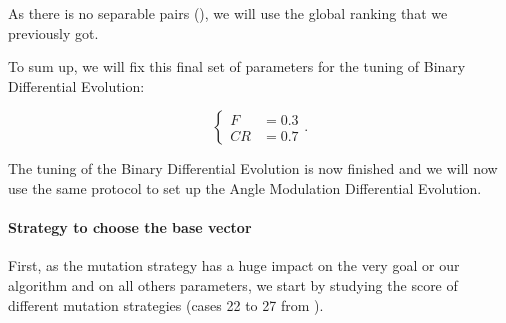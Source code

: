 \documentclass[12pt, openany]{article}
\begin{document}
As there is no separable pairs (), we will use the global ranking that we previously got.

\begin{table}[H]
    \centering
    \renewcommand{\arraystretch}{1.3}
    \caption{\textbf{Summary of statistical significance tests for the $F$ and $CR$ parameter combinations.} The Critical Difference (CD) sets the threshold for Nemenyi pairwise significance. No significant differences were detected ($p \ge 0.05$).}
    \label{tab:statistical_tests_BDE_F_CR}
\end{table}

To sum up, we will fix this final set of parameters for the tuning of Binary Differential Evolution:

$$
\boxed{
\begin{cases}
    F &= 0.3 \\
    CR &= 0.7
\end{cases}
}.
$$

The tuning of the Binary Differential Evolution is now finished and we will now use the same protocol to set up the Angle Modulation Differential Evolution.

\label{sec:AMDE_parameters}

\paragraph{Strategy to choose the base vector} First, as the mutation strategy has a huge impact on the very goal or our algorithm and on all others parameters, we start by studying the score of different mutation strategies (cases 22 to 27 from ).
\end{document}
